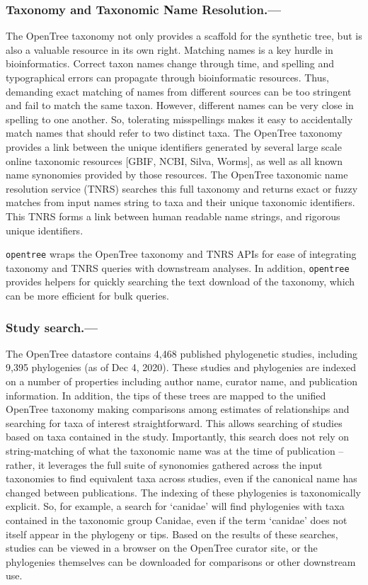 \documentclass[oupdraft]{sysbio_sse}
\begin{document}
\subsubsection{Taxonomy and Taxonomic Name Resolution.---} The OpenTree taxonomy not only provides a scaffold for the synthetic tree, but is also a valuable resource in its own right.
Matching names is a key hurdle in bioinformatics.
Correct taxon names change through time, and spelling and typographical errors can propagate through bioinformatic resources.
Thus, demanding exact matching of names from different sources can be too stringent and fail to match the same taxon.
However, different names can be very close in spelling to one another.
So, tolerating misspellings makes it easy to accidentally match names that should refer to two distinct taxa.
The OpenTree taxonomy \citep{rees_automated_2017, opentreeoflife_open_2019-1} provides a link between the unique identifiers generated by several large scale online taxonomic resources [GBIF, NCBI, Silva, Worms], as well as all known name synonomies provided by those resources.
The OpenTree taxonomic name resolution service (TNRS) searches this full taxonomy and returns exact or fuzzy matches from input names string to taxa and their unique taxonomic identifiers.
This TNRS forms a link between human readable name strings, and rigorous unique identifiers.

\texttt{opentree} wraps the OpenTree taxonomy and TNRS APIs for ease of integrating taxonomy and TNRS queries with downstream analyses. In addition, \texttt{opentree} provides helpers for quickly searching the text download of the taxonomy, which can be more efficient for bulk queries.


\subsubsection{Study search.---} The OpenTree datastore contains 4,468 published phylogenetic studies, including 9,395 phylogenies (as of Dec 4, 2020).
These studies and phylogenies are indexed on a number of properties including author name, curator name, and publication information.
In addition, the tips of these trees are mapped to the unified OpenTree taxonomy making comparisons among estimates of relationships and searching for taxa of interest straightforward.
This allows searching of studies based on taxa contained in the study.
Importantly, this search does not rely on string-matching of what the taxonomic name was at the time of publication -- rather, it leverages the full suite of synonomies gathered across the input taxonomies to find equivalent taxa across studies, even if the canonical name has changed between publications.
The indexing of these phylogenies is taxonomically explicit.
So, for example, a search for `canidae' will find phylogenies with taxa contained in the taxonomic group Canidae, even if the term `canidae' does not itself appear in the phylogeny or tips.
Based on the results of these searches, studies can be viewed in a browser on the OpenTree curator site, or the phylogenies themselves can be downloaded for comparisons or other downstream use.
\end{document}
